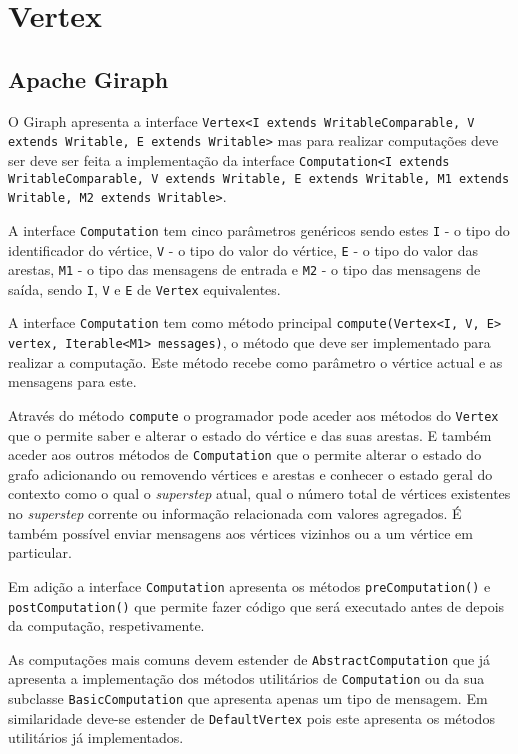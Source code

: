 \newpage
\section{Vertex}

\subsection*{Apache Giraph}


O Giraph apresenta a interface \texttt{Vertex<I extends WritableComparable, V extends Writable, E extends Writable>} mas para realizar computações deve ser deve ser feita a implementação da interface \texttt{Computation<I extends WritableComparable, V extends Writable, E extends Writable, M1 extends Writable, M2 extends Writable>}.

A interface \texttt{Computation} tem cinco parâmetros genéricos sendo estes \texttt{I} - o tipo do identificador do vértice, \texttt{V} - o tipo do valor do vértice, \texttt{E} - o tipo do valor das arestas, \texttt{M1} - o tipo das mensagens de entrada e \texttt{M2} - o tipo das mensagens de saída, sendo \texttt{I}, \texttt{V} e \texttt{E} de \texttt{Vertex} equivalentes.

A interface \texttt{Computation} tem como método principal \texttt{compute(Vertex<I, V, E> vertex, Iterable<M1> messages)}, o método que deve ser implementado para realizar a computação. Este método recebe como parâmetro o vértice actual e as mensagens para este.

Através do método \texttt{compute} o programador pode aceder aos métodos do \texttt{Vertex} que o permite saber e alterar o estado do vértice e das suas arestas. E também aceder aos outros métodos de \texttt{Computation} que o permite alterar o estado do grafo adicionando ou removendo vértices e arestas e conhecer o estado geral do contexto como o qual o \textit{superstep} atual, qual o número total de vértices existentes no \textit{superstep} corrente ou informação relacionada com valores agregados. É também possível enviar mensagens aos vértices vizinhos ou a um vértice em particular.

Em adição a interface \texttt{Computation} apresenta os métodos \texttt{preComputation()} e \texttt{postComputation()} que permite fazer código que será executado antes de depois da computação, respetivamente.

As computações mais comuns devem estender de \texttt{AbstractComputation} que já apresenta a implementação dos métodos utilitários de \texttt{Computation} ou da sua subclasse \texttt{BasicComputation} que apresenta apenas um tipo de mensagem.
Em similaridade deve-se estender de \texttt{DefaultVertex} pois este apresenta os métodos utilitários já implementados.

